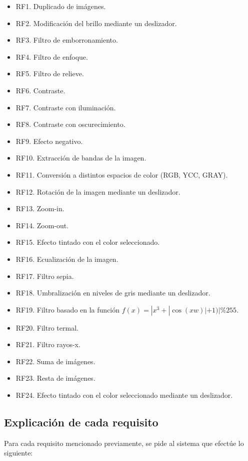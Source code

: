 \documentclass[11pt,a4paper]{article}
\begin{document}
\begin{itemize}
	\item RF1. Duplicado de imágenes.
	\item RF2. Modificación del brillo mediante un deslizador.
	\item RF3. Filtro de emborronamiento.
	\item RF4. Filtro de enfoque.
	\item RF5. Filtro de relieve.
	\item RF6. Contraste.
	\item RF7. Contraste con iluminación.
	\item RF8. Contraste con oscurecimiento.
	\item RF9. Efecto negativo.
	\item RF10. Extracción de bandas de la imagen.
	\item RF11. Conversión a distintos espacios de color (RGB, YCC, GRAY).
	\item RF12. Rotación de la imagen mediante un deslizador.
	\item RF13. Zoom-in.
	\item RF14. Zoom-out.
	\item RF15. Efecto tintado con el color seleccionado.
	\item RF16. Ecualización de la imagen.
	\item RF17. Filtro sepia.
	\item RF18. Umbralización en niveles de gris mediante un deslizador.
	\item RF19. Filtro basado en la función $f(x)=|x^3+|\cos(xw)|+1)|\%255$.
	\item RF20. Filtro termal.
	\item RF21. Filtro rayos-x.
	\item RF22. Suma de imágenes.
	\item RF23. Resta de imágenes.
	\item RF24. Efecto tintado con el color seleccionado mediante un deslizador.
\end{itemize}

\subsection{Explicación de cada requisito}

Para cada requisito mencionado previamente, se pide al sistema que efectúe lo siguiente:
\end{document}
